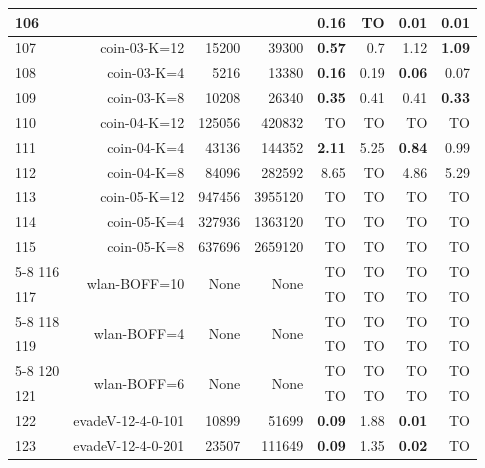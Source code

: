 \begin{longtable}{lrr@{\hskip 12pt}r@{\hskip 12pt}r@{\hskip 12pt}r@{\hskip 12pt}r@{\hskip 12pt}r}
106 &  &  &  & \textbf{0.16} & TO & \textbf{0.01} & 0.01 \\
\midrule
107 & \multirow{1}{*}{coin-03-K=12} & \multirow{1}{*}{15200} & \multirow{1}{*}{39300} & \textbf{0.57} & 0.7 & 1.12 & \textbf{1.09} \\
108 & \multirow{1}{*}{coin-03-K=4} & \multirow{1}{*}{5216} & \multirow{1}{*}{13380} & \textbf{0.16} & 0.19 & \textbf{0.06} & 0.07 \\
109 & \multirow{1}{*}{coin-03-K=8} & \multirow{1}{*}{10208} & \multirow{1}{*}{26340} & \textbf{0.35} & 0.41 & 0.41 & \textbf{0.33} \\
110 & \multirow{1}{*}{coin-04-K=12} & \multirow{1}{*}{125056} & \multirow{1}{*}{420832} & TO & TO & TO & TO \\
111 & \multirow{1}{*}{coin-04-K=4} & \multirow{1}{*}{43136} & \multirow{1}{*}{144352} & \textbf{2.11} & 5.25 & \textbf{0.84} & 0.99 \\
112 & \multirow{1}{*}{coin-04-K=8} & \multirow{1}{*}{84096} & \multirow{1}{*}{282592} & 8.65 & TO & 4.86 & 5.29 \\
113 & \multirow{1}{*}{coin-05-K=12} & \multirow{1}{*}{947456} & \multirow{1}{*}{3955120} & TO & TO & TO & TO \\
114 & \multirow{1}{*}{coin-05-K=4} & \multirow{1}{*}{327936} & \multirow{1}{*}{1363120} & TO & TO & TO & TO \\
115 & \multirow{1}{*}{coin-05-K=8} & \multirow{1}{*}{637696} & \multirow{1}{*}{2659120} & TO & TO & TO & TO \\
\cmidrule{5-8}
116 & \multirow{2}{*}{wlan-BOFF=10} & \multirow{2}{*}{None} & \multirow{2}{*}{None} & TO & TO & TO & TO \\
117 &  &  &  & TO & TO & TO & TO \\
\cmidrule{5-8}
118 & \multirow{2}{*}{wlan-BOFF=4} & \multirow{2}{*}{None} & \multirow{2}{*}{None} & TO & TO & TO & TO \\
119 &  &  &  & TO & TO & TO & TO \\
\cmidrule{5-8}
120 & \multirow{2}{*}{wlan-BOFF=6} & \multirow{2}{*}{None} & \multirow{2}{*}{None} & TO & TO & TO & TO \\
121 &  &  &  & TO & TO & TO & TO \\
\midrule
122 & \multirow{1}{*}{evadeV-12-4-0-101} & \multirow{1}{*}{10899} & \multirow{1}{*}{51699} & \textbf{0.09} & 1.88 & \textbf{0.01} & TO \\
123 & \multirow{1}{*}{evadeV-12-4-0-201} & \multirow{1}{*}{23507} & \multirow{1}{*}{111649} & \textbf{0.09} & 1.35 & \textbf{0.02} & TO \\

\end{longtable}
